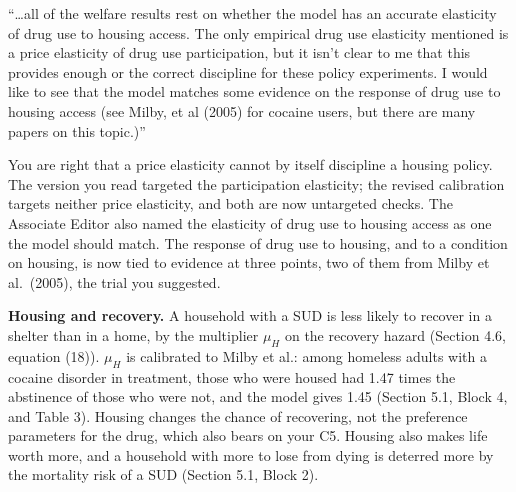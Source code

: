 \documentclass[11pt]{article}
\begin{document}
\begin{referee}
``\dots all of the welfare results rest on whether the model has an accurate
elasticity of drug use to housing access. The only empirical drug use elasticity
mentioned is a price elasticity of drug use participation, but it isn't clear to
me that this provides enough or the correct discipline for these policy
experiments. I would like to see that the model matches some evidence on the
response of drug use to housing access (see Milby, et al (2005) for cocaine users,
but there are many papers on this topic.)''
\end{referee}
\begin{response}
You are right that a price elasticity cannot by itself discipline a housing policy. The
version you read targeted the participation elasticity; the revised calibration targets
neither price elasticity, and both are now untargeted checks. The Associate Editor also
named the elasticity of drug use to housing access as one the model should match. The
response of drug use to housing, and to a condition on housing, is now tied to evidence
at three points, two of them from Milby et al.\ (2005), the trial you suggested.

\textbf{Housing and recovery.} A household with a SUD is less likely to recover in a
shelter than in a home, by the multiplier $\mu_H$ on the recovery hazard (Section 4.6,
equation (18)). $\mu_H$ is calibrated to Milby et al.: among homeless adults with a
cocaine disorder in treatment, those who were housed had 1.47 times the abstinence of those
who were not, and the model gives 1.45 (Section 5.1, Block 4, and Table 3). Housing changes
the chance of recovering, not the preference parameters for the drug, which also bears on
your C5. Housing also makes life worth more, and a household with more to lose from dying
is deterred more by the mortality risk of a SUD (Section 5.1, Block 2).


\end{response}
\end{document}
